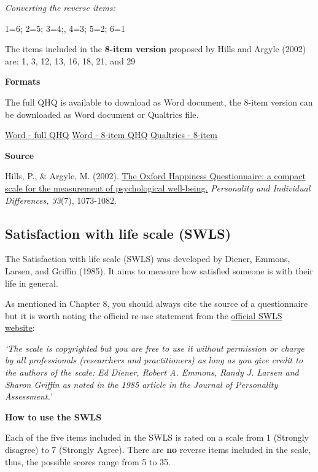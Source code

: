 \documentclass[
]{book}
\begin{document}
\emph{Converting the reverse items:}

1=6; 2=5; 3=4;, 4=3; 5=2; 6=1

The items included in the \textbf{8-item version} proposed by Hills and Argyle (2002) are: 1, 3, 12, 13, 16, 18, 21, and 29

\textbf{Formats}

The full QHQ is available to download as Word document, the 8-item version can be downloaded as Word document or Qualtrics file.

\href{questionnaires/OxfordHappinessQuestionnaire.docx}{Word - full QHQ} \textbar{} \href{questionnaires/OxfordHappinessQuestionnaire_8ItemVersion.docx}{Word - 8-item QHQ} \textbar{} \href{questionnaires/OxfordHappinessQuestionnaire_8ItemVersion.qsf}{Qualtrics - 8-item}

\textbf{Source}

Hills, P., \& Argyle, M. (2002). \href{https://pdfs.semanticscholar.org/cadd/7a4eea79e031ec0cf8b8054f668057f33dda.pdf}{The Oxford Happiness Questionnaire: a compact scale for the measurement of psychological well-being.} \emph{Personality and Individual Differences, 33}(7), 1073-1082.

\hypertarget{satisfaction-with-life-scale-swls}{%
\subsection{Satisfaction with life scale (SWLS)}\label{satisfaction-with-life-scale-swls}}

The Satisfaction with life scale (SWLS) was developed by Diener, Emmons, Larsen, and Griffin (1985). It aims to measure how satisfied someone is with their life in general.

As mentioned in Chapter 8, you should always cite the source of a questionnaire but it is worth noting the official re-use statement from the \href{http://labs.psychology.illinois.edu/~ediener/SWLS.html}{official SWLS website}:

\emph{`The scale is copyrighted but you are free to use it without permission or charge by all professionals (researchers and practitioners) as long as you give credit to the authors of the scale: Ed Diener, Robert A. Emmons, Randy J. Larsen and Sharon Griffin as noted in the 1985 article in the Journal of Personality Assessment.'}

\textbf{How to use the SWLS}

Each of the five items included in the SWLS is rated on a scale from 1 (Strongly disagree) to 7 (Strongly Agree). There are \textbf{no} reverse items included in the scale, thus, the possible scores range from 5 to 35.
\end{document}
